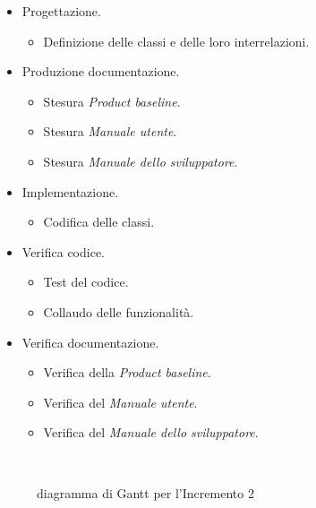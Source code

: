 \documentclass[../piano-di-progetto.tex]{subfiles}
\begin{document}
\begin{itemize}
  \item Progettazione.
  \begin{itemize}
    \item Definizione delle classi e delle loro interrelazioni.
  \end{itemize}
  \item Produzione documentazione.
  \begin{itemize}
    \item Stesura \textit{Product baseline}.
    \item Stesura \textit{Manuale utente}.
    \item Stesura \textit{Manuale dello sviluppatore}.
  \end{itemize}
  \item Implementazione.
  \begin{itemize}
    \item Codifica delle classi.
  \end{itemize}
  \item Verifica codice.
  \begin{itemize}
    \item Test del codice.
    \item Collaudo delle funzionalità.
  \end{itemize}
  \item Verifica documentazione.
  \begin{itemize}
    \item Verifica della \textit{Product baseline}.
    \item Verifica del \textit{Manuale utente}.
    \item Verifica del \textit{Manuale dello sviluppatore}.
  \end{itemize}
\end{itemize}
\begin{figure}[H]
  \centering
  
  \caption{diagramma di Gantt per l'Incremento 2}%
~~\label{fig:gantt_incremento_2}
\end{figure}
\end{document}
